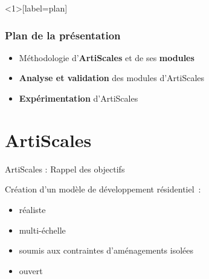 \documentclass[xcolor=table]{beamer}
\begin{document}


\begin{frame}<1>[label=plan]
\frametitle{Plan de la présentation}
	\begin{itemize}
		\item Méthodologie d'\textbf{ArtiScales} et de ses \textbf{modules}
		\item \textbf{Analyse et validation} des modules d'ArtiScales
		\item \textbf{Expérimentation} d'ArtiScales
	\end{itemize}
\end{frame}


\section{ArtiScales}

\begin{frame}{ArtiScales : Rappel des objectifs}
		\begin{block}{}
		Création d'un modèle de développement résidentiel~:
		\begin{itemize}
			\footnotesize
			\item réaliste %
			\item multi-échelle %
			\item soumis aux contraintes d'aménagements isolées %
			\item ouvert %
		\end{itemize}
	\end{block}
\end{frame}
\end{document}
